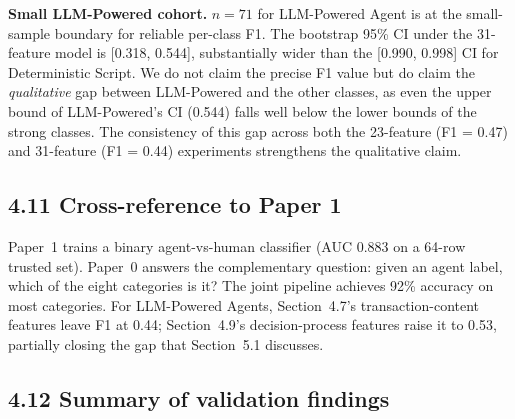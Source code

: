 \documentclass[sigconf,nonacm=false]{acmart}
\begin{document}
\textbf{Small LLM-Powered cohort.} $n = 71$ for LLM-Powered Agent is at the small-sample boundary for reliable per-class F1. The bootstrap 95\% CI under the 31-feature model is [0.318, 0.544], substantially wider than the [0.990, 0.998] CI for Deterministic Script. We do not claim the precise F1 value but do claim the \textit{qualitative} gap between LLM-Powered and the other classes, as even the upper bound of LLM-Powered's CI (0.544) falls well below the lower bounds of the strong classes. The consistency of this gap across both the 23-feature (F1 = 0.47) and 31-feature (F1 = 0.44) experiments strengthens the qualitative claim.

\subsection{4.11 Cross-reference to Paper 1}

Paper~1 trains a binary agent-vs-human classifier (AUC 0.883 on a 64-row trusted set). Paper~0 answers the complementary question: given an agent label, which of the eight categories is it? The joint pipeline achieves 92\% accuracy on most categories. For LLM-Powered Agents, Section~4.7's transaction-content features leave F1 at 0.44; Section~4.9's decision-process features raise it to 0.53, partially closing the gap that Section~5.1 discusses.

\subsection{4.12 Summary of validation findings}
\end{document}
